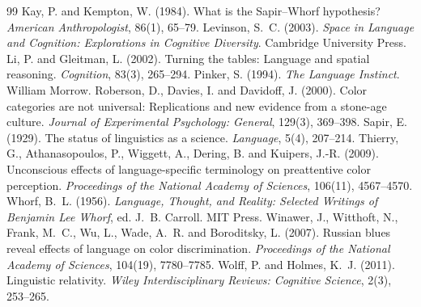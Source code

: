 \documentclass{situationist-preprint}
\begin{document}
\begin{thebibliography}{99}
 Kay, P. and Kempton, W. (1984). What is the Sapir--Whorf hypothesis? \emph{American Anthropologist}, 86(1), 65--79.
 Levinson, S.~C. (2003). \emph{Space in Language and Cognition: Explorations in Cognitive Diversity}. Cambridge University Press.
 Li, P. and Gleitman, L. (2002). Turning the tables: Language and spatial reasoning. \emph{Cognition}, 83(3), 265--294.
 Pinker, S. (1994). \emph{The Language Instinct}. William Morrow.
 Roberson, D., Davies, I. and Davidoff, J. (2000). Color categories are not universal: Replications and new evidence from a stone-age culture. \emph{Journal of Experimental Psychology: General}, 129(3), 369--398.
 Sapir, E. (1929). The status of linguistics as a science. \emph{Language}, 5(4), 207--214.
 Thierry, G., Athanasopoulos, P., Wiggett, A., Dering, B. and Kuipers, J.-R. (2009). Unconscious effects of language-specific terminology on preattentive color perception. \emph{Proceedings of the National Academy of Sciences}, 106(11), 4567--4570.
 Whorf, B.~L. (1956). \emph{Language, Thought, and Reality: Selected Writings of Benjamin Lee Whorf}, ed. J.~B. Carroll. MIT Press.
 Winawer, J., Witthoft, N., Frank, M.~C., Wu, L., Wade, A.~R. and Boroditsky, L. (2007). Russian blues reveal effects of language on color discrimination. \emph{Proceedings of the National Academy of Sciences}, 104(19), 7780--7785.
 Wolff, P. and Holmes, K.~J. (2011). Linguistic relativity. \emph{Wiley Interdisciplinary Reviews: Cognitive Science}, 2(3), 253--265.
\end{thebibliography}
\end{document}
